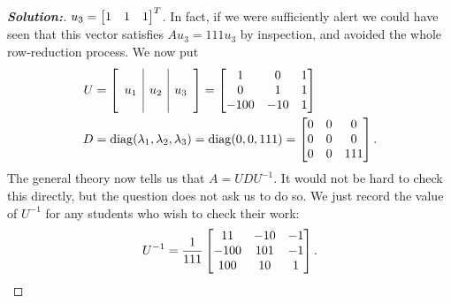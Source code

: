 \documentclass[a4paper]{amsart}
\theoremstyle{definition}
\newenvironment{solution}{\begin{proof}[\textbf{Solution:}] \vphantom{u}}{\end{proof}}
\begin{document}
\begin{solution}
 $u_3=\left[\begin{matrix} 1&1&1\end{matrix}\right]^T$.  In fact, if we were sufficiently alert we
 could have seen that this vector satisfies $Au_3=111u_3$ by
 inspection, and avoided the whole row-reduction process.
 We now put 
 \begin{align*}
  U &=
   \left[\begin{array}{c|c|c} && \\ u_1 & u_2 & u_3 \\ && \end{array}\right]
   = \left[\begin{matrix} 1 & 0 & 1 \\ 0 & 1 & 1 \\ -100 & -10 & 1 \end{matrix}\right] \\
  D &= \operatorname{diag}(\lambda_1,\lambda_2,\lambda_3) = \operatorname{diag}(0,0,111) = 
       \left[\begin{matrix} 0&0&0 \\ 0&0&0 \\ 0&0&111 \end{matrix}\right].
 \end{align*}
 The general theory now tells us that $A=UDU^{-1}$.  It would not be
 hard to check this directly, but the question does not ask us to do
 so.  We just record the value of $U^{-1}$ for any students who wish
 to check their work:
 \[ U^{-1} = \frac{1}{111} \left[\begin{matrix}
      11&-10&-1\\
      -100&101&-1\\
      100&10&1\\
      \end{matrix}\right].
 \]
\end{solution}
\end{document}
